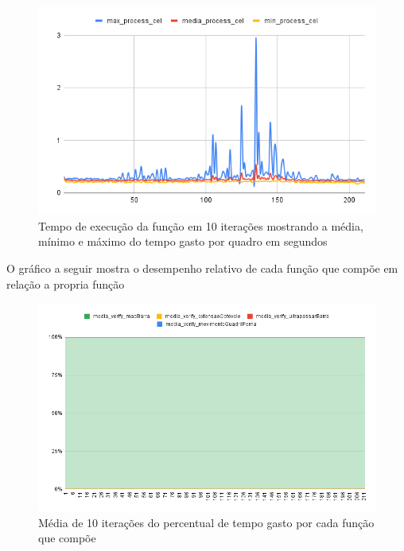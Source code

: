 \begin{figure}[H]
	\centering
	\caption{Tempo de execução da função  em 10 iterações mostrando a média, mínimo e máximo do tempo gasto por quadro em segundos}
	\includegraphics[scale=0.8]{figuras/grafico/process_cell.png}
\end{figure}










\newpage

O gráfico a seguir mostra o desempenho relativo de cada função que compõe  em relação a propria função 

\begin{figure}[H]
	\centering
	\caption{ Média de 10 iterações do percentual de tempo gasto por cada função que compõe  }
	\includegraphics[scale=0.6]{figuras/grafico/comp_char_AFD.png}
\end{figure}




